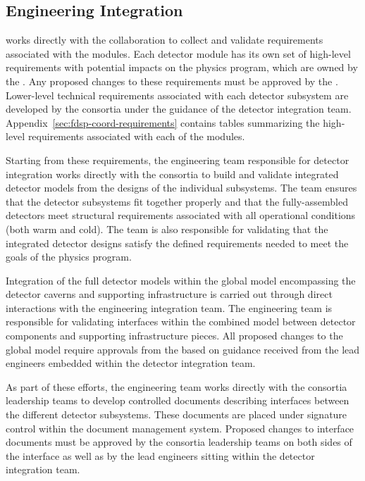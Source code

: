 \subsection{Engineering Integration}

  works directly with the collaboration to 
collect and validate requirements associated with the  
modules.  Each detector module has its own set of high-level 
requirements with potential impacts on the  physics 
program, which are owned by the  .  Any 
proposed changes to these requirements must be approved by the 
.  Lower-level technical requirements associated 
with each detector subsystem are developed by the consortia 
under the guidance of the  detector integration team.  
Appendix~\ref{sec:fdsp-coord-requirements} contains tables 
summarizing the high-level requirements associated with each of 
the  modules.

Starting from these requirements, the  engineering
team responsible for detector integration works directly with the
 consortia to build and validate integrated detector
models from the designs of the individual subsystems.  The team
ensures that the detector subsystems fit together properly and
that the fully-assembled detectors meet structural requirements
associated with all operational conditions (both warm and cold).
The team is also responsible for validating that the integrated
detector designs satisfy the defined requirements needed to meet
the goals of the  physics program.

Integration of the full detector models within the global model
encompassing the detector caverns and supporting infrastructure
is carried out through direct interactions with the 
engineering integration team.  The  engineering team
is responsible for validating interfaces within the combined
model between  detector components and supporting 
infrastructure pieces.  All proposed changes to the global model 
require approvals from the  based on guidance
received from the lead engineers embedded within the 
detector integration team.

As part of these efforts, the engineering team works directly 
with the consortia leadership teams to develop controlled 
documents describing interfaces between the different detector 
subsystems.  These documents are placed under signature control 
within the  document management system.  
Proposed changes to interface documents must be approved by 
the consortia leadership teams on both sides of the interface 
as well as by the lead engineers sitting within the  
detector integration team.

